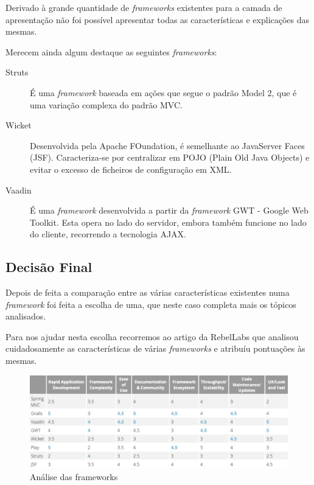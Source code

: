 Derivado à grande quantidade de \textit{frameworks} existentes para a camada de apresentação não foi possível apresentar todas as características e explicações das mesmas.

Merecem ainda algum destaque as seguintes \textit{frameworks}:

\begin{description}

\item[Struts] É uma \textit{framework} baseada em ações que segue o padrão Model 2, que é uma variação complexa do padrão MVC.

\item[Wicket] Desenvolvida pela Apache FOundation, é semelhante ao JavaServer Faces (JSF). Caracteriza-se por centralizar em POJO (Plain Old Java Objects) e evitar o excesso de ficheiros de configuração em XML.

\item[Vaadin] É uma \textit{framework} desenvolvida a partir da \textit{framework} GWT - Google Web Toolkit. Esta opera no lado do servidor, embora também funcione no lado do cliente, recorrendo a tecnologia AJAX.

\end{description}

\subsection{Decisão Final}

Depois de feita a comparação entre as várias características existentes numa \textit{framework} foi feita a escolha de uma, que neste caso completa mais os tópicos analisados.

Para nos ajudar nesta escolha recorremos ao artigo da RebelLabs que analisou cuidadosamente as características de várias \textit{frameworks} e atribuíu pontuações às mesmas.

\newpage

\begin{figure}
\centering
\includegraphics[width=130mm]{img/frams.png}
\caption{Análise das frameworks}
\end{figure}

